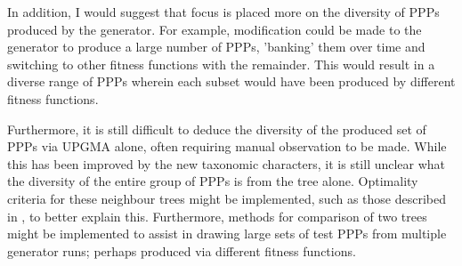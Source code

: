 \documentclass[authoryearcitations]{UoYCSproject}
\begin{document}
In addition, I would suggest that focus is placed more on the diversity of PPPs produced by the generator. For example, modification could be made to the generator to produce a large number of PPPs, 'banking' them over time and switching to other fitness functions with the remainder. This would result in a diverse range of PPPs wherein each subset would have been produced by different fitness functions.

Furthermore, it is still difficult to deduce the diversity of the produced set of PPPs via UPGMA alone, often requiring manual observation to be made. While this has been improved by the new taxonomic characters, it is still unclear what the diversity of the entire group of PPPs is from the tree alone. Optimality criteria for these neighbour trees might be implemented, such as those described in \cite[chapter 11, p.~426]{phylo}, to better explain this. Furthermore, methods for comparison of two trees \cite[chapter 11 p.~504]{phylo} might be implemented to assist in drawing large sets of test PPPs from multiple generator runs; perhaps produced via different fitness functions.
\end{document}
